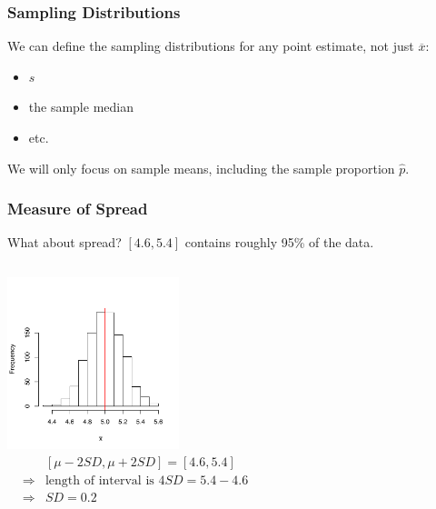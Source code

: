 \documentclass[handout]{beamer}
\newcommand{\blue}[1]{\textcolor{blue2}{#1}}
\newcommand{\xbar}{\overline{x}}
\begin{document}
\begin{frame}[fragile]
\frametitle{Sampling Distributions}

We can define the sampling distributions for \blue{any} point estimate, not just $\xbar$:
\pause \begin{itemize}
\item $s$
\item the sample median
\item etc.
\end{itemize}

\pause We will only focus on sample means, including the sample proportion $\widehat{p}$.

\end{frame}


\begin{frame}[fragile]
\frametitle{Measure of Spread}
What about spread?  $[4.6, 5.4]$ contains roughly 95\% of the data.

\begin{columns}[c]
\includegraphics[width=5cm]{figure/lec12-001}
\pause{}
\begin{eqnarray*}
&& [\mu - 2 SD, \mu + 2SD] = [4.6, 5.4]\\
&\Rightarrow& \mbox{length of interval is } 4SD = 5.4-4.6\\
&\Rightarrow& SD = 0.2
\end{eqnarray*}
\end{columns}




\end{frame}
\end{document}
